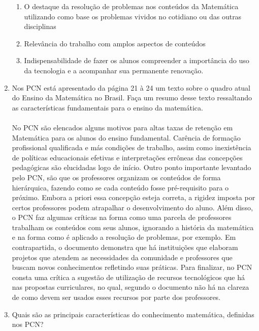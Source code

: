 \documentclass[a4paper, 12pt]{article}
\begin{document}
\begin{enumerate}
\begin{enumerate}
  \item O destaque da resolução de problemas nos conteúdos da Matemática utilizando como base os problemas vividos no cotidiano ou das outras disciplinas
  \item Relevância do trabalho com amplos aspectos de conteúdos
  \item Indispensabilidade de fazer os alunos compreender a importância do uso da tecnologia e a acompanhar sua permanente renovação.
  \end{enumerate}
\item Nos PCN está apresentado da página 21 à 24 um texto sobre o quadro atual do Ensino da Matemática no Brasil. Faça um resumo desse texto ressaltando as características fundamentais para o ensino da matemática. \\ \\
  No PCN são elencados alguns motivos para altas taxas de retenção em Matemática para os alunos do ensino fundamental. Carência de formação profissional qualificada e más condições de trabalho, assim como inexistência de políticas educacionais efetivas e interpretações errôneas das concepções pedagógicas são elucidadas logo de início. Outro ponto importante levantado pelo PCN, são que os professores organizam os conteúdos de forma hierárquica, fazendo como se cada conteúdo fosse pré-requisito para o próximo. Embora a priori essa concepção esteja correta, a rigidez imposta por certos professores podem atrapalhar o desenvolvimento do aluno. Além disso, o PCN faz algumas críticas na forma como uma parcela de professores trabalham os conteúdos com seus alunos, ignorando a história da matemática e na forma como é aplicado a resolução de problemas, por exemplo.
  Em contrapartida, o documento demonstra que há instituições que elaboram projetos que atendem as necessidades da comunidade e professores que buscam novos conhecimentos refletindo suas práticas.
  Para finalizar, no PCN consta uma crítica a sugestão de utilização de recursos tecnológicos que há nas propostas curriculares, no qual, segundo o documento não há na clareza de como devem ser usados esses recursos por parte dos professores.
\item Quais são as principais características do conhecimento matemática, definidas nos PCN? \\ \\
  

\end{enumerate}
\end{document}
